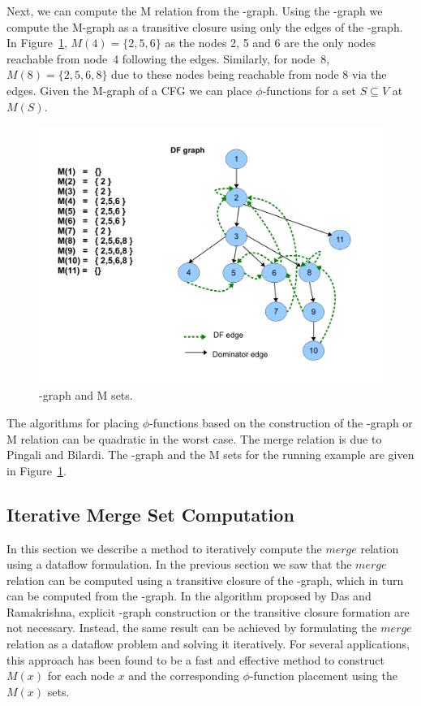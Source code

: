 {Next, we can compute the M relation from the \DF-graph. 
Using the \DF-graph we compute the M-graph as a transitive closure
using only the \DF edges of the \DJ-graph. In Figure~\ref{fig:mgraph}, $M(4) = 
\{2,5,6\}$ as the nodes 2, 5 and 6 are the only nodes reachable from node~4 
following the \DF edges. Similarly, for node~8, $M(8) = \{2,5,6,8\}$ due to these nodes being reachable from node 8 via the \DF edges. Given the M-graph of a CFG we can place $\phi$-functions for a set $S \subseteq V$ at $M(S)$.

    \begin{figure}[htb]
    \centerline{\includegraphics[scale=0.4]{mgraph_1.pdf}}
    \caption{\DF-graph and M sets.}
    \label{fig:mgraph}
    \end{figure} 


The algorithms for placing $\phi$-functions based on the construction of the 
\DF-graph or M relation can be quadratic in the worst case. The merge relation 
is due to Pingali and Bilardi. The \DF-graph and the M sets for the running 
example are given in Figure~\ref{fig:mgraph}.

\subsection{Iterative Merge Set Computation}
In this section we describe a method to iteratively compute the 
$\textit{merge}$ relation using a dataflow formulation. In the previous section 
we saw that the $\textit{merge}$ relation can be computed using a transitive 
closure of the \DF-graph, which in turn can be computed from the \DJ-graph. In 
the algorithm proposed by Das and Ramakrishna, explicit \DF-graph construction 
or the transitive closure formation are not necessary. Instead, the same result 
can be achieved by formulating the $\textit{merge}$ relation as a dataflow 
problem and solving it iteratively. For several applications, this approach has 
been found to be a fast and effective method to construct $M(x)$ for each node 
$x$ and the corresponding $\phi$-function placement using the $M(x)$ sets. 

}
